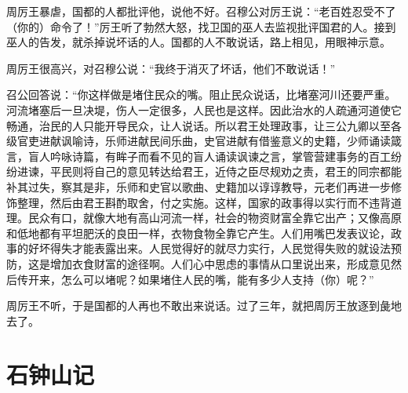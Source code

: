 \documentclass[12pt,UTF-8,openany,a4]{ctexbook}
\begin{document}
\begin{large}
    \yiwen 
    周厉王暴虐，国都的人都批评他，说他不好。召穆公对厉王说：“老百姓忍受不了（你的）命令了！”厉王听了勃然大怒，找卫国的巫人去监视批评国君的人。接到巫人的告发，就杀掉说坏话的人。国都的人不敢说话，路上相见，用眼神示意。
    
    周厉王很高兴，对召穆公说：“我终于消灭了坏话，他们不敢说话！”
    
    召公回答说：“你这样做是堵住民众的嘴。阻止民众说话，比堵塞河川还要严重。河流堵塞后一旦决堤，伤人一定很多，人民也是这样。因此治水的人疏通河道使它畅通，治民的人只能开导民众，让人说话。所以君王处理政事，让三公九卿以至各级官吏进献讽喻诗，乐师进献民间乐曲，史官进献有借鉴意义的史籍，少师诵读箴言，盲人吟咏诗篇，有眸子而看不见的盲人诵读讽谏之言，掌管营建事务的百工纷纷进谏，平民则将自己的意见转达给君王，近侍之臣尽规劝之责，君王的同宗都能补其过失，察其是非，乐师和史官以歌曲、史籍加以谆谆教导，元老们再进一步修饰整理，然后由君王斟酌取舍，付之实施。这样，国家的政事得以实行而不违背道理。民众有口，就像大地有高山河流一样，社会的物资财富全靠它出产；又像高原和低地都有平坦肥沃的良田一样，衣物食物全靠它产生。人们用嘴巴发表议论，政事的好坏得失才能表露出来。人民觉得好的就尽力实行，人民觉得失败的就设法预防，这是增加衣食财富的途径啊。人们心中思虑的事情从口里说出来，形成意见然后传开来，怎么可以堵呢？如果堵住人民的嘴，能有多少人支持（你）呢？”
    
    周厉王不听，于是国都的人再也不敢出来说话。过了三年，就把周厉王放逐到彘地去了。
    
\end{large}



\chapter{石钟山记}
\end{document}
